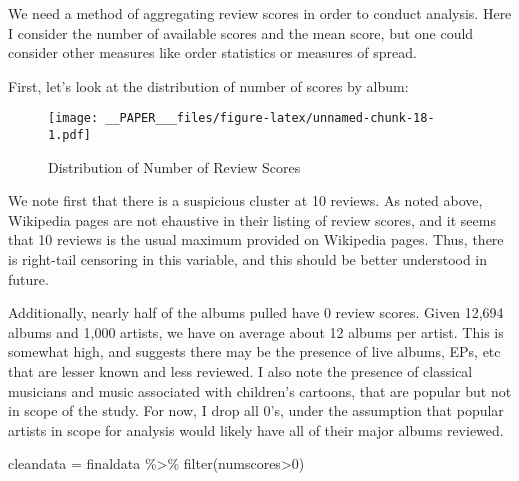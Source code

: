 \documentclass[
  11pt,
]{article}
\newenvironment{Shaded}{\begin{snugshade}}{\end{snugshade}}
\newcommand{\AttributeTok}[1]{\textcolor[rgb]{0.77,0.63,0.00}{#1}}
\newcommand{\ControlFlowTok}[1]{\textcolor[rgb]{0.13,0.29,0.53}{\textbf{#1}}}
\newcommand{\DecValTok}[1]{\textcolor[rgb]{0.00,0.00,0.81}{#1}}
\newcommand{\FunctionTok}[1]{\textcolor[rgb]{0.00,0.00,0.00}{#1}}
\newcommand{\NormalTok}[1]{#1}
\newcommand{\OtherTok}[1]{\textcolor[rgb]{0.56,0.35,0.01}{#1}}
\newcommand{\SpecialCharTok}[1]{\textcolor[rgb]{0.00,0.00,0.00}{#1}}
\begin{document}
We need a method of aggregating review scores in order to conduct
analysis. Here I consider the number of available scores and the mean
score, but one could consider other measures like order statistics or
measures of spread.

\begin{Shaded}
\end{Shaded}

First, let's look at the distribution of number of scores by album:

\begin{figure}
\centering
\texttt{[image: \_\_PAPER\_\_\_files/figure-latex/unnamed-chunk-18-1.pdf]}
\caption{Distribution of Number of Review Scores}
\end{figure}

We note first that there is a suspicious cluster at 10 reviews. As noted
above, Wikipedia pages are not ehaustive in their listing of review
scores, and it seems that 10 reviews is the usual maximum provided on
Wikipedia pages. Thus, there is right-tail censoring in this variable,
and this should be better understood in future.

Additionally, nearly half of the albums pulled have 0 review scores.
Given 12,694 albums and 1,000 artists, we have on average about 12
albums per artist. This is somewhat high, and suggests there may be the
presence of live albums, EPs, etc that are lesser known and less
reviewed. I also note the presence of classical musicians and music
associated with children's cartoons, that are popular but not in scope
of the study. For now, I drop all 0's, under the assumption that popular
artists in scope for analysis would likely have all of their major
albums reviewed.

\begin{Shaded}
\begin{Highlighting}[]
\NormalTok{cleandata }\OtherTok{=}\NormalTok{ finaldata }\SpecialCharTok{\%\textgreater{}\%}
  \FunctionTok{filter}\NormalTok{(numscores}\SpecialCharTok{\textgreater{}}\DecValTok{0}\NormalTok{)}
\end{Highlighting}
\end{Shaded}
\end{document}
